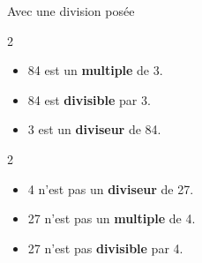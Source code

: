 \begin{exemple*1}
	Avec une division posée

	\begin{multicols}2
		\columnbreak
		\begin{itemize}
			\item 84 est un \textbf{multiple} de 3.
			\item 84 est \textbf{divisible} par 3.
			\item 3 est un \textbf{diviseur} de 84.
		\end{itemize}
	\end{multicols}

	\begin{multicols}2
		\opidiv[displayintermediary=all]{27}{4}
		\columnbreak
		\begin{itemize}
			\item 4 n'est pas un \textbf{diviseur} de 27.
			\item 27 n'est pas un \textbf{multiple} de 4.
			\item 27 n'est pas \textbf{divisible} par 4.
		\end{itemize}
	\end{multicols}	
\end{exemple*1}